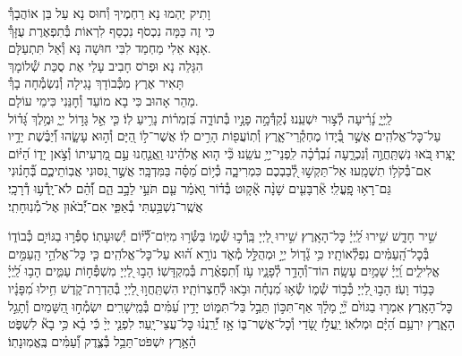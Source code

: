 \documentclass[twoside, openany, parskip=half, 11pt]{book}
\begin{document}
וָתִיק יֶהְמוּ נָא רַחְמֶיךָ וְ֯חוּס נָא עַל בֵּן אוֹהֲבָךְ֯\\
כִּי זֶה כַּמָּה נִכְסֹף נִכְסַף לִרְאוֹת בְּ֯תִפְאֶרֶת עֻזָּךְ֯\\
אָנָּא אֵלִי מַחְמַד לִבִּי חוּשָׁה נָּא וְ֯אַל תִּתְעַלָּם.\\

הִגָּלֵה נָא וּפְרֹס חָבִיב עָלַי אֶת סֻכַּת שְׁ֯לוֹמָךְ\\
תָּאִיר אֶרֶץ מִכְּ֯בוֹדָךְ נָגִילָה וְ֯נִשְׂמְ֯חָה בָךְ֯\\
מַהֵר אָהוּב כִּי בָא מוֹעֵד וְ֯חׇנֵּנִי כִּימֵי עוֹלָם.\\

לַֽיְיָ֑ נָ֝רִ֗יעָה לְ֯צ֣וּר יִשְׁעֵֽנוּ׃
נְ֯קַדְּ֯מָ֣ה פָנָ֣יו בְּ֯תוֹדָ֑ה בִּ֝זְמִר֗וֹת נָרִ֥יעַ לֽוֹ׃
כִּ֤י אֵ֣ל גָּד֣וֹל יְיָ֑ וּמֶ֥לֶךְ גָּ֝ד֗וֹל עַל־כׇּל־אֱלֹהִֽים׃
אֲשֶׁ֣ר בְּ֭֯יָדוֹ מֶחְקְ֯רֵי־אָ֑רֶץ וְ֯תֽוֹעֲפ֖וֹת הָרִ֣ים לֽוֹ׃
אֲשֶׁר־ל֣וֹ הַ֭יָּם וְ֯ה֣וּא עָשָׂ֑הוּ וְ֝֯יַבֶּ֗שֶׁת יָדָ֥יו יָצָֽרוּ׃
בֹּ֭אוּ נִשְׁתַּֽחֲוֶ֣ה וְ֯נִכְרָ֑עָה נִ֝בְרְ֯כָ֗ה לִֽפְנֵי־יְיָ֥ עֹשֵֽׂנוּ׃
כִּ֘י ה֤וּא אֱלֹהֵ֗ינוּ וַֽאֲנַ֤חְנוּ עַ֣ם מַ֭רְעִיתוֹ וְ֯צֹ֣אן יָד֑וֹ הַ֝יּ֗וֹם אִם־בְּ֯קֹל֥וֹ תִשְׁמָֽעוּ׃
אַל־תַּקְשׁ֣וּ לְ֭֯בַבְכֶם כִּמְרִיבָ֑ה כְּ֯י֥וֹם מַ֝סָּ֗ה בַּמִּדְבָּֽר׃
אֲשֶׁ֣ר נִ֭סּוּנִי אֲבֽוֹתֵיכֶ֑ם בְּ֝֯חָנ֗וּנִי גַּם־רָא֥וּ פׇֽעֳלִֽי׃
אַ֘רְבָּעִ֤ים שָׁנָ֨ה אָ֘ק֤וּט בְּ֯ד֗וֹר וָֽאֹמַ֗ר עַ֤ם תֹּעֵ֣י לֵבָ֣ב הֵ֑ם וְ֝֯הֵ֗ם לֹא־יָֽדְ֯ע֥וּ דְ֯רָכָֽי׃
אֲשֶֽׁר־נִשְׁבַּ֥עְתִּי בְ֯אַפִּ֑י אִם־יְ֝֯בֹא֗וּן אֶל־מְ֯נֽוּחָתִֽי׃


שִׁ֣יר חָדָ֑שׁ שִׁ֥ירוּ לַֽ֝יְיָ֗ כׇּל־הָאָֽרֶץ׃
שִׁ֣ירוּ לַ֭יְיָ בָּֽרְ֯כ֣וּ שְׁ֯מ֑וֹ בַּשְּׂ֯ר֥וּ מִיּֽוֹם־לְ֝֯י֗וֹם יְ֯שֽׁוּעָתֽוֹ׃
סַפְּ֯ר֣וּ בַגּוֹיִ֣ם כְּ֯בוֹד֑וֹ בְּ֯כׇל־הָֽ֝עַמִּ֗ים נִפְלְ֯אוֹתָֽיו׃
כִּ֥י גָ֘ד֤וֹל יְיָ֣ וּמְהֻלָּ֣ל מְ֯אֹ֑ד נוֹרָ֥א ה֝֗וּא עַל־כׇּל־אֱלֹהִֽים׃
כִּ֤י כׇּל־אֱלֹהֵ֣י הָֽעַמִּ֣ים אֱלִילִ֑ים וַֽ֝יְיָ֗ שָׁמַ֥יִם עָשָֽׂה׃
הוֹד־וְ֯הָדָ֥ר לְ֯פָנָ֑יו עֹ֥ז וְ֝֯תִפְאֶ֗רֶת בְּ֯מִקְדָּשֽׁוֹ׃
הָב֣וּ לַ֭יְיָ מִשְׁפְּ֯ח֣וֹת עַמִּ֑ים הָב֥וּ לַֽ֝יְיָ֗ כָּב֥וֹד וָעֹֽז׃
הָב֣וּ לַ֭יְיָ כְּ֯ב֣וֹד שְׁ֯מ֑וֹ שְׂ֯א֥וּ מִ֝נְחָ֗ה וּבֹ֥אוּ לְ֯חַצְרוֹתָֽיו׃
הִשְׁתַּֽחֲו֣וּ לַ֭יְיָ בְּ֯הַדְרַת־קֹ֑דֶשׁ חִ֥ילוּ מִ֝פָּנָ֗יו כׇּל־הָאָֽרֶץ׃
אִמְר֤וּ בַגּוֹיִ֨ם יְ֘יָ֤ מָלָ֗ךְ אַף־תִּכּ֣וֹן תֵּבֵ֣ל בַּל־תִּמּ֑וֹט יָדִ֥ין עַ֝מִּ֗ים בְּ֯מֵֽישָׁרִֽים׃
יִשְׂמְ֯ח֣וּ הַ֭שָּׁמַיִם וְ֯תָגֵ֣ל הָאָ֑רֶץ יִרְעַ֥ם הַ֝יָּ֗ם וּמְלֹאֽוֹ׃
יַֽעֲלֹ֣ז שָׂ֭דַי וְ֯כׇל־אֲשֶׁר־בּ֑וֹ אָ֥ז יְ֝֯רַֽנֲנ֗וּ כׇּל־עֲצֵי־יָֽעַר׃
לִפְנֵ֤י יְיָ֨ כִּ֬י בָ֗א כִּ֥י בָא֘ לִשְׁפֹּ֢ט הָ֫אָ֥רֶץ יִשְׁפֹּט־תֵּבֵ֥ל בְּ֯צֶ֑דֶק וְ֝֯עַמִּ֗ים בֶּֽאֱמֽוּנָתֽוֹ׃
\end{document}
